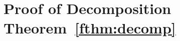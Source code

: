 \section{Proof of Decomposition Theorem~\ref{fthm:decomp}} \label{fsec:decomp-proof}
\def\F{F_\mathsf{tentative}}
%
%
